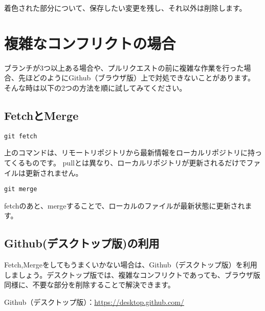\documentclass[
]{book}
\begin{document}
着色された部分について、保存したい変更を残し、それ以外は削除します。

\hypertarget{ux8907ux96d1ux306aux30b3ux30f3ux30d5ux30eaux30afux30c8ux306eux5834ux5408}{%
\section{複雑なコンフリクトの場合}\label{ux8907ux96d1ux306aux30b3ux30f3ux30d5ux30eaux30afux30c8ux306eux5834ux5408}}

ブランチが3つ以上ある場合や、プルリクエストの前に複雑な作業を行った場合、先ほどのようにGithub（ブラウザ版）上で対処できないことがあります。
そんな時は以下の2つの方法を順に試してみてください。

\hypertarget{fetchux3068merge}{%
\subsection{FetchとMerge}\label{fetchux3068merge}}

\begin{verbatim}
git fetch
\end{verbatim}

上のコマンドは、リモートリポジトリから最新情報をローカルリポジトリに持ってくるものです。
pullとは異なり、ローカルリポジトリが更新されるだけでファイルは更新されません。

\begin{verbatim}
git merge
\end{verbatim}

fetchのあと、mergeすることで、ローカルのファイルが最新状態に更新されます。

\hypertarget{githubux30c7ux30b9ux30afux30c8ux30c3ux30d7ux7248ux306eux5229ux7528}{%
\subsection{Github(デスクトップ版)の利用}\label{githubux30c7ux30b9ux30afux30c8ux30c3ux30d7ux7248ux306eux5229ux7528}}

Fetch,Mergeをしてもうまくいかない場合は、Github（デスクトップ版）を利用しましょう。デスクトップ版では、複雑なコンフリクトであっても、ブラウザ版同様に、不要な部分を削除することで解決できます。

Github（デスクトップ版）：\url{https://desktop.github.com/}

  
\end{document}
